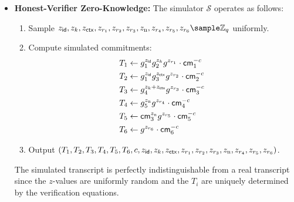 \begin{itemize}
    \item \textbf{Honest-Verifier Zero-Knowledge:} The simulator $\mathcal{S}$ operates as follows:
    \begin{enumerate}
        \item Sample $z_{\id}, z_k, z_{\ctx}, z_{r_1}, z_{r_2}, z_{r_3}, z_{\text{n}}, z_{r_4}, z_{r_5}, z_{r_6} \sample \mathbb{Z}_q$ uniformly.
        \item Compute simulated commitments:
        \begin{align*}
            T_1 &\gets g_1^{z_{\mathsf{id}}} g_2^{z_k} g^{z_{r_1}} \cdot \mathsf{cm}_1^{-c} \\
            T_2 &\gets g_1^{z_{\mathsf{id}}} g_3^{z_{\mathsf{ctx}}} g^{z_{r_2}} \cdot \mathsf{cm}_2^{-c} \\
            T_3 &\gets g_4^{z_k + z_{\mathsf{ctx}}} g^{z_{r_3}} \cdot \mathsf{cm}_3^{-c} \\
            T_4 &\gets g_5^{z_{\text{n}}} g^{z_{r_4}} \cdot \mathsf{cm}_4^{-c} \\
            T_5 &\gets \mathsf{cm}_3^{z_{\text{n}}} g^{z_{r_5}} \cdot \mathsf{cm}_5^{-c} \\
            T_6 &\gets g^{z_{r_6}} \cdot \mathsf{cm}_6^{-c}
        \end{align*}
        \item Output $(T_1, T_2, T_3, T_4, T_5, T_6, c, z_{\mathsf{id}}, z_k, z_{\mathsf{ctx}}, z_{r_1}, z_{r_2}, z_{r_3}, z_{\text{n}}, z_{r_4}, z_{r_5}, z_{r_6})$.
    \end{enumerate}
    The simulated transcript is perfectly indistinguishable from a real transcript since the $z$-values are uniformly random and the $T_i$ are uniquely determined by the verification equations.
\end{itemize}

